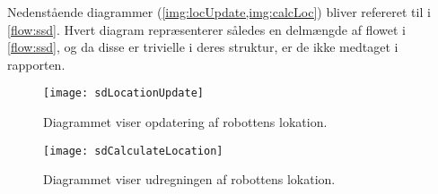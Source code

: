 Nedenstående diagrammer (\cref{img:locUpdate,img:calcLoc}) bliver refereret til i \cref{flow:ssd}.
Hvert diagram repræsenterer således en delmængde af flowet i \cref{flow:ssd}, og da disse er trivielle i deres struktur, er de ikke medtaget i rapporten.

\begin{landscape}

	\begin{figure}[H]
	\centering \texttt{[image: sdLocationUpdate]}
	\caption{Diagrammet viser opdatering af robottens lokation.}
	\label{img:locUpdate}
	\end{figure} 
	
	\begin{figure}[H]
	\centering \texttt{[image: sdCalculateLocation]}
	\caption{Diagrammet viser udregningen af robottens lokation.}
	\label{img:calcLoc}
	\end{figure}
	
\end{landscape}